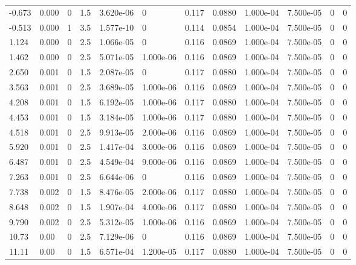 \documentclass[preview]{standalone}
\begin{document}
{{\begin{tabular}{L{1.2cm}C{1.2cm} C{0.3cm}C{0.5cm} C{1.4cm}C{1.4cm} C{1.4cm}C{1.4cm} C{1.6cm}C{1.6cm} C{1.6cm}C{1.6cm}}
  -0.673  &  0.000  & 0     & 1.5 &  3.620e-06  & 0  &  0.117&   0.0880& 1.000e-04 & 7.500e-05   &  0 & 0  \\ 
  -0.513  &  0.000  & 1     & 3.5 &  1.577e-10  & 0  &  0.114&   0.0854& 1.000e-04 & 7.500e-05   &  0 & 0  \\ 
  1.124  &  0.000  & 0     & 2.5 &  1.066e-05  & 0  &  0.116&   0.0869& 1.000e-04 & 7.500e-05   &  0 & 0  \\ 
  1.462  &  0.000  & 0     & 2.5 &  5.071e-05  & 1.000e-06  &  0.116&   0.0869& 1.000e-04 & 7.500e-05   &  0 & 0  \\ 
  2.650  &  0.001  & 0     & 1.5 &  2.087e-05  & 0  &  0.117&   0.0880& 1.000e-04 & 7.500e-05   &  0 & 0  \\ 
  3.563  &  0.001  & 0     & 2.5 &  3.689e-05  & 1.000e-06  &  0.116&   0.0869& 1.000e-04 & 7.500e-05   &  0 & 0  \\ 
  4.208  &  0.001  & 0     & 1.5 &  6.192e-05  & 1.000e-06  &  0.117&   0.0880& 1.000e-04 & 7.500e-05   &  0 & 0  \\ 
  4.453  &  0.001  & 0     & 1.5 &  3.184e-05  & 1.000e-06  &  0.117&   0.0880& 1.000e-04 & 7.500e-05   &  0 & 0  \\ 
  4.518  &  0.001  & 0     & 2.5 &  9.913e-05  & 2.000e-06  &  0.116&   0.0869& 1.000e-04 & 7.500e-05   &  0 & 0  \\ 
  5.920  &  0.001  & 0     & 2.5 &  1.417e-04  & 3.000e-06  &  0.116&   0.0869& 1.000e-04 & 7.500e-05   &  0 & 0  \\ 
  6.487  &  0.001  & 0     & 2.5 &  4.549e-04  & 9.000e-06  &  0.116&   0.0869& 1.000e-04 & 7.500e-05   &  0 & 0  \\ 
  7.263  &  0.001  & 0     & 2.5 &  6.644e-06  & 0  &  0.116&   0.0869& 1.000e-04 & 7.500e-05   &  0 & 0  \\ 
  7.738  &  0.002  & 0     & 1.5 &  8.476e-05  & 2.000e-06  &  0.117&   0.0880& 1.000e-04 & 7.500e-05   &  0 & 0  \\ 
  8.648  &  0.002  & 0     & 1.5 &  1.907e-04  & 4.000e-06  &  0.117&   0.0880& 1.000e-04 & 7.500e-05   &  0 & 0  \\ 
  9.790  &  0.002  & 0     & 2.5 &  5.312e-05  & 1.000e-06  &  0.116&   0.0869& 1.000e-04 & 7.500e-05   &  0 & 0  \\ 
  10.73  &  0.00  & 0     & 2.5 &  7.129e-06  & 0  &  0.116&   0.0869& 1.000e-04 & 7.500e-05   &  0 & 0  \\ 
  11.11  &  0.00  & 0     & 1.5 &  6.571e-04  & 1.200e-05  &  0.117&   0.0880& 1.000e-04 & 7.500e-05   &  0 & 0  \\ 

\end{tabular}}}
\end{document}
